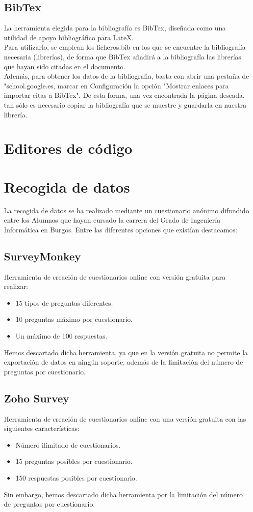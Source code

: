 \subsection{BibTex}
\nonzeroparskip
La herramienta elegida para la bibliografía es BibTex, diseñada como una utilidad de apoyo bibliográfico para LateX. \\
\nonzeroparskip
Para utilizarlo, se emplean los ficheros.bib en los que se encuentre la bibliografía necesaria (librerías), de forma que BibTex añadirá a la bibliografía las librerías que hayan sido citadas en el documento. \\
\nonzeroparskip
Además, para obtener los datos de la bibliografia, basta con abrir una pestaña de  "school.google.es, marcar en Configuración la opción "Mostrar enlaces para importar citas a BibTex". De esta forma, una vez encontrada la página deseada, tan sólo es necesario copiar la bibliografía que se muestre y guardarla en nuestra librería.\cite{perez1968titulo} 

\section{Editores de código}
\section{Recogida de datos}
La recogida de datos se ha realizado mediante un cuestionario anónimo difundido entre los Alumnos que hayan cursado la carrera del Grado de Ingeniería Informática en Burgos. Entre las diferentes opciones que existían destacamos: 
\subsection{SurveyMonkey}
Herramienta de creación de cuestionarios online con versión gratuita para realizar: 
\begin{itemize}
\item 15 tipos de preguntas diferentes. 
\item 10 preguntas máximo por cuestionario. 
\item Un máximo de 100 respuestas.  
\end{itemize}
Hemos descartado dicha herramienta, ya que en la versión gratuita no permite la exportación de datos en ningún soporte, además de la limitación del número de preguntas por cuestionario. 
\subsection{Zoho Survey}
Herramienta de creación de cuestionarios online con una versión gratuita con las siguientes características: 
\begin{itemize}
\item Número ilimitado de cuestionarios. 
\item 15 preguntas posibles por cuestionario. 
\item 150 respuestas posibles por cuestionario. 
\end{itemize}
Sin embargo, hemos descartado dicha herramienta por la limitación del número de preguntas por cuestionario. 
